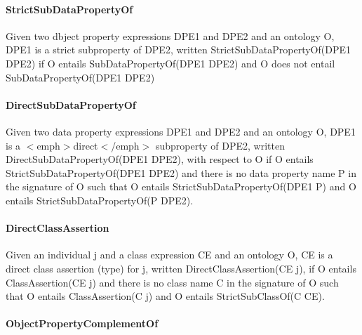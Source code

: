 \paragraph*{Strict\-Sub\-Data\-Property\-Of}

Given two dbject property expressions {\ttfamily D\-P\-E1} and {\ttfamily D\-P\-E2} and an ontology {\ttfamily O}, {\ttfamily D\-P\-E1} is a strict subproperty of {\ttfamily D\-P\-E2}, written {\ttfamily Strict\-Sub\-Data\-Property\-Of(\-D\-P\-E1 D\-P\-E2)} if {\ttfamily O} entails {\ttfamily Sub\-Data\-Property\-Of(\-D\-P\-E1 D\-P\-E2)} and {\ttfamily O} does not entail {\ttfamily Sub\-Data\-Property\-Of(\-D\-P\-E1 D\-P\-E2)} 

\paragraph*{Direct\-Sub\-Data\-Property\-Of}

Given two data property expressions {\ttfamily D\-P\-E1} and {\ttfamily D\-P\-E2} and an ontology {\ttfamily O}, {\ttfamily D\-P\-E1} is a $<$emph$>$direct$<$/emph$>$ subproperty of {\ttfamily D\-P\-E2}, written {\ttfamily Direct\-Sub\-Data\-Property\-Of(\-D\-P\-E1 D\-P\-E2)}, with respect to {\ttfamily O} if {\ttfamily O} entails {\ttfamily Strict\-Sub\-Data\-Property\-Of(\-D\-P\-E1 D\-P\-E2)} and there is no data property name {\ttfamily P} in the signature of {\ttfamily O} such that {\ttfamily O} entails {\ttfamily Strict\-Sub\-Data\-Property\-Of(\-D\-P\-E1 P)} and {\ttfamily O} entails {\ttfamily Strict\-Sub\-Data\-Property\-Of(\-P D\-P\-E2)}. 

\paragraph*{Direct\-Class\-Assertion}

Given an individual {\ttfamily j} and a class expression {\ttfamily C\-E} and an ontology {\ttfamily O}, {\ttfamily C\-E} is a direct class assertion (type) for {\ttfamily j}, written {\ttfamily Direct\-Class\-Assertion(\-C\-E j)}, if {\ttfamily O} entails {\ttfamily Class\-Assertion(\-C\-E j)} and there is no class name {\ttfamily C} in the signature of {\ttfamily O} such that {\ttfamily O} entails {\ttfamily Class\-Assertion(\-C j)} and {\ttfamily O} entails {\ttfamily Strict\-Sub\-Class\-Of(\-C C\-E)}. \paragraph*{Object\-Property\-Complement\-Of}

